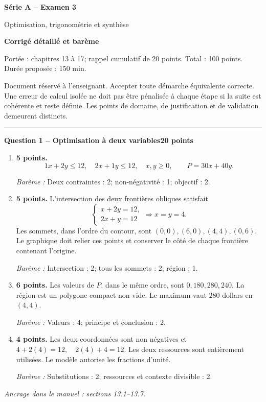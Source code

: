 \documentclass[11pt,a4paper]{article}
\begin{document}
{\LARGE\bfseries Série A -- Examen 3}\par
{\large Optimisation, trigonométrie et synthèse}\par
\textbf{Corrigé détaillé et barème}\par
Portée : chapitres 13 à 17; rappel cumulatif de 20 points. Total : 100 points. Durée proposée : 150 min.\par
\small Document réservé à l’enseignant. Accepter toute démarche équivalente correcte. Une erreur de calcul isolée ne doit pas être pénalisée à chaque étape si la suite est cohérente et reste définie. Les points de domaine, de justification et de validation demeurent distincts.\normalsize\par
\vspace{3mm}\hrule\vspace{4mm}
{\large\bfseries Question 1 -- Optimisation à deux variables}\hfill\textbf{20 points}\par
\begin{enumerate}
\item \textbf{5 points.} \[1x+2y\le 12,\quad 2x+1y\le 12,\quad x,y\ge0,\qquad P=30x+40y.\]
\par{\small\textit{Barème : }Deux contraintes : 2; non-négativité : 1; objectif : 2.}
\item \textbf{5 points.} L’intersection des deux frontières obliques satisfait \[\begin{cases}x+2y=12,\\2x+y=12\end{cases}\Longrightarrow x=y=4.\] Les sommets, dans l’ordre du contour, sont \((0,0),(6,0),(4,4),(0,6)\). Le graphique doit relier ces points et conserver le côté de chaque frontière contenant l’origine.
\par{\small\textit{Barème : }Intersection : 2; tous les sommets : 2; région : 1.}
\item \textbf{6 points.} Les valeurs de \(P\), dans le même ordre, sont \(0,180,280,240\). La région est un polygone compact non vide. Le maximum vaut \(280\) dollars en \((4,4)\).
\par{\small\textit{Barème : }Valeurs : 4; principe et conclusion : 2.}
\item \textbf{4 points.} Les deux coordonnées sont non négatives et \(4+2(4)=12,\quad2(4)+4=12\). Les deux ressources sont entièrement utilisées. Le modèle autorise les fractions d’unité.
\par{\small\textit{Barème : }Substitutions : 2; ressources et contexte divisible : 2.}
\end{enumerate}
\vfill {\small\textit{Ancrage dans le manuel : sections 13.1--13.7.}}
\end{document}

